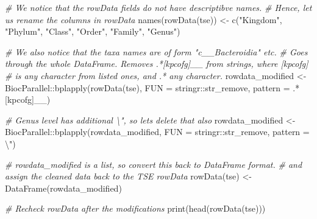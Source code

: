 \documentclass[
  oneside]{book}
\newenvironment{Shaded}{\begin{snugshade}}{\end{snugshade}}
\newcommand{\AttributeTok}[1]{\textcolor[rgb]{0.77,0.63,0.00}{#1}}
\newcommand{\CommentTok}[1]{\textcolor[rgb]{0.56,0.35,0.01}{\textit{#1}}}
\newcommand{\FunctionTok}[1]{\textcolor[rgb]{0.00,0.00,0.00}{#1}}
\newcommand{\NormalTok}[1]{#1}
\newcommand{\OtherTok}[1]{\textcolor[rgb]{0.56,0.35,0.01}{#1}}
\newcommand{\SpecialCharTok}[1]{\textcolor[rgb]{0.00,0.00,0.00}{#1}}
\newcommand{\StringTok}[1]{\textcolor[rgb]{0.31,0.60,0.02}{#1}}
\begin{document}
\begin{Shaded}
\begin{Highlighting}[]
\CommentTok{\# We notice that the rowData fields do not have descriptibve names.}
\CommentTok{\# Hence, let us rename the columns in rowData}
\FunctionTok{names}\NormalTok{(}\FunctionTok{rowData}\NormalTok{(tse)) }\OtherTok{\textless{}{-}} \FunctionTok{c}\NormalTok{(}\StringTok{"Kingdom"}\NormalTok{, }\StringTok{"Phylum"}\NormalTok{, }\StringTok{"Class"}\NormalTok{, }\StringTok{"Order"}\NormalTok{, }
                        \StringTok{"Family"}\NormalTok{, }\StringTok{"Genus"}\NormalTok{)}

\CommentTok{\# We also notice that the taxa names are of form "c\_\_Bacteroidia" etc.}
\CommentTok{\# Goes through the whole DataFrame. Removes \textquotesingle{}.*[kpcofg]\_\_\textquotesingle{} from strings, where [kpcofg] }
\CommentTok{\# is any character from listed ones, and .* any character.}
\NormalTok{rowdata\_modified }\OtherTok{\textless{}{-}}\NormalTok{ BiocParallel}\SpecialCharTok{::}\FunctionTok{bplapply}\NormalTok{(}\FunctionTok{rowData}\NormalTok{(tse), }
                                           \AttributeTok{FUN =}\NormalTok{ stringr}\SpecialCharTok{::}\NormalTok{str\_remove, }
                                           \AttributeTok{pattern =} \StringTok{\textquotesingle{}.*[kpcofg]\_\_\textquotesingle{}}\NormalTok{)}

\CommentTok{\# Genus level has additional \textquotesingle{}\textbackslash{}"\textquotesingle{}, so let\textquotesingle{}s delete that also}
\NormalTok{rowdata\_modified }\OtherTok{\textless{}{-}}\NormalTok{ BiocParallel}\SpecialCharTok{::}\FunctionTok{bplapply}\NormalTok{(rowdata\_modified, }
                                           \AttributeTok{FUN =}\NormalTok{ stringr}\SpecialCharTok{::}\NormalTok{str\_remove, }
                                           \AttributeTok{pattern =} \StringTok{\textquotesingle{}}\SpecialCharTok{\textbackslash{}"}\StringTok{\textquotesingle{}}\NormalTok{)}

\CommentTok{\# rowdata\_modified is a list, so convert this back to DataFrame format. }
\CommentTok{\# and assign the cleaned data back to the TSE rowData}
\FunctionTok{rowData}\NormalTok{(tse) }\OtherTok{\textless{}{-}} \FunctionTok{DataFrame}\NormalTok{(rowdata\_modified)}

\CommentTok{\# Recheck rowData after the modifications}
\FunctionTok{print}\NormalTok{(}\FunctionTok{head}\NormalTok{(}\FunctionTok{rowData}\NormalTok{(tse)))}
\end{Highlighting}
\end{Shaded}
\end{document}
